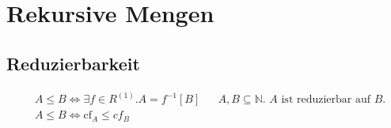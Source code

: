 \documentclass[10pt,oneside,a4paper]{scrartcl}
\begin{document}
\section{Rekursive Mengen}

\subsection{Reduzierbarkeit}

    \begin{align}
    &A \leq B \Longleftrightarrow \exists f \in R^{(1)}.A=f^{-1}[B]
        && \text{$A, B \subseteq\mathbb{N}$. $A$ ist reduzierbar auf $B$.}\\
    &A \leq B \Longleftrightarrow \text{cf}_A\leq cf_B
    \end{align}
\end{document}
